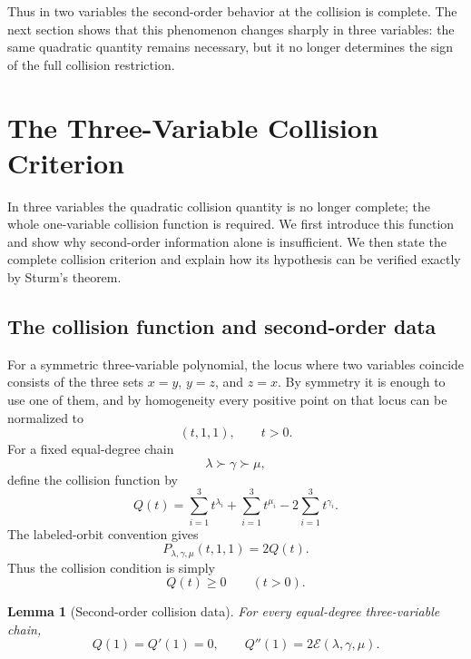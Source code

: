 \documentclass[11pt]{article}
\newtheorem{lemma}[theorem]{Lemma}
\theoremstyle{definition}
\newcommand{\Energy}{\mathcal E}
\begin{document}
Thus in two variables the second-order behavior at the collision is complete.  The next section shows that this phenomenon changes sharply in three variables: the same quadratic quantity remains necessary, but it no longer determines the sign of the full collision restriction.

\section{The Three-Variable Collision Criterion}
\label{sec:collision-criterion}

In three variables the quadratic collision quantity is no longer complete; the whole one-variable collision function is required.  We first introduce this function and show why second-order information alone is insufficient.  We then state the complete collision criterion and explain how its hypothesis can be verified exactly by Sturm's theorem.

\subsection{The collision function and second-order data}

For a symmetric three-variable polynomial, the locus where two variables coincide consists of the three sets \(x=y\), \(y=z\), and \(z=x\).  By symmetry it is enough to use one of them, and by homogeneity every positive point on that locus can be normalized to
\begin{equation*}
(t,1,1),
\qquad t>0.
\end{equation*}
For a fixed equal-degree chain
\begin{equation*}
\lambda\succ\gamma\succ\mu,
\end{equation*}
define the collision function by
\begin{equation*}
Q(t)
=\sum_{i=1}^3 t^{\lambda_i}
+\sum_{i=1}^3 t^{\mu_i}
-2\sum_{i=1}^3 t^{\gamma_i}.
\end{equation*}
The labeled-orbit convention gives
\begin{equation*}
P_{\lambda,\gamma,\mu}(t,1,1)=2Q(t).
\end{equation*}
Thus the collision condition is simply
\begin{equation*}
Q(t)\ge0
\qquad(t>0).
\end{equation*}

\begin{lemma}[Second-order collision data]\label{lem:collision-energy}
For every equal-degree three-variable chain,
\begin{equation*}
Q(1)=Q'(1)=0,
\qquad
Q''(1)=2\Energy(\lambda,\gamma,\mu).
\end{equation*}
\end{lemma}
\end{document}
